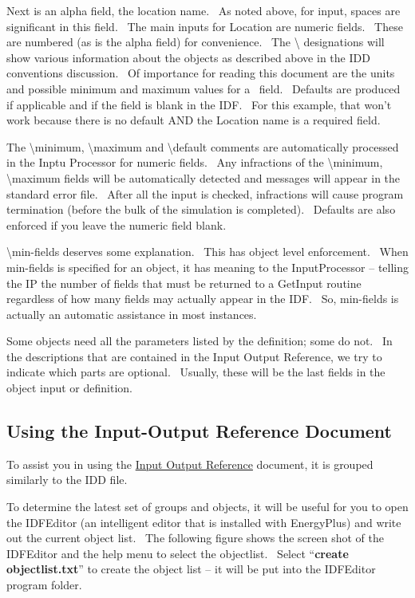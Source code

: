Next is an alpha field, the location name.~ As noted above, for input, spaces are significant in this field.~ The main inputs for Location are numeric fields.~ These are numbered (as is the alpha field) for convenience.~ The \textbackslash{} designations will show various information about the objects as described above in the IDD conventions discussion.~ Of importance for reading this document are the units and possible minimum and maximum values for a~ field.~ Defaults are produced if applicable and if the field is blank in the IDF.~ For this example, that won't work because there is no default AND the Location name is a required field.

The \textbackslash{}minimum, \textbackslash{}maximum and \textbackslash{}default comments are automatically processed in the Inptu Processor for numeric fields.~ Any infractions of the \textbackslash{}minimum, \textbackslash{}maximum fields will be automatically detected and messages will appear in the standard error file.~ After all the input is checked, infractions will cause program termination (before the bulk of the simulation is completed).~ Defaults are also enforced if you leave the numeric field blank.

\textbackslash{}min-fields deserves some explanation.~ This has object level enforcement.~ When min-fields is specified for an object, it has meaning to the InputProcessor -- telling the IP the number of fields that must be returned to a GetInput routine regardless of how many fields may actually appear in the IDF.~ So, min-fields is actually an automatic assistance in most instances.

Some objects need all the parameters listed by the definition; some do not.~ In the descriptions that are contained in the Input Output Reference, we try to indicate which parts are optional.~ Usually, these will be the last fields in the object input or definition.

\subsection{Using the Input-Output Reference Document}\label{using-the-input-output-reference-document}

To assist you in using the \href{file:///E:/Docs4PDFs/InputOutputReference.pdf}{Input Output Reference} document, it is grouped similarly to the IDD file.

To determine the latest set of groups and objects, it will be useful for you to open the IDFEditor (an intelligent editor that is installed with EnergyPlus) and write out the current object list.~ The following figure shows the screen shot of the IDFEditor and the help menu to select the objectlist.~ Select ``\textbf{create objectlist.txt}'' to create the object list -- it will be put into the IDFEditor program folder.

